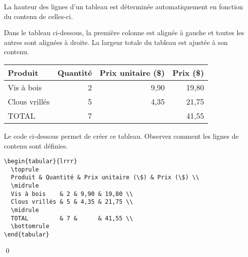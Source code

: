 La hauteur des lignes d'un tableau est déterminée automatiquement en
fonction du contenu de celles-ci.

\begin{exemple}
  \label{exemple:tableaux:tabular:1}
  Dans le tableau ci-dessous, la première
  colonne est alignée à gauche et toutes les autres sont alignées à
  droite. La largeur totale du tableau est ajustée à son contenu.
  \begin{center}
    \begin{tabular}{lrrr}
      \toprule
      Produit & Quantité & Prix unitaire (\$) & Prix (\$) \\
      \midrule
      Vis à bois    & 2 & 9,90 & 19,80 \\
      Clous vrillés & 5 & 4,35 & 21,75 \\
      \midrule
      TOTAL         & 7 &      & 41,55 \\
      \bottomrule
    \end{tabular}
  \end{center}
  Le code ci-dessous permet de créer ce tableau. Observez comment les
  lignes de contenu sont définies.
\begin{lstlisting}
\begin{tabular}{lrrr}
  \toprule
  Produit & Quantité & Prix unitaire (\$) & Prix (\$) \\
  \midrule
  Vis à bois    & 2 & 9,90 & 19,80 \\
  Clous vrillés & 5 & 4,35 & 21,75 \\
  \midrule
  TOTAL         & 7 &      & 41,55 \\
  \bottomrule
\end{tabular}
\end{lstlisting}
  \qed
\end{exemple}

